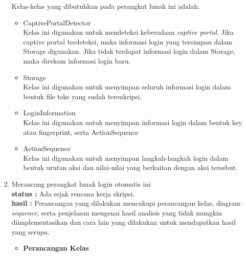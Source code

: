 \documentclass[a4paper,twoside]{article}
\begin{document}
\begin{enumerate}
        Kelas-kelas yang dibutuhkan pada perangkat lunak ini adalah:
        
        \begin{itemize}
            \item{CaptivePortalDetector\\Kelas ini digunakan untuk mendeteksi keberadaan \textit{captive portal}. Jika captive portal terdeteksi, maka informasi login yang tersimpan dalam Storage digunakan. Jika tidak terdapat informasi login dalam Storage, maka direkam informasi login baru.}
            \item{Storage\\Kelas ini digunakan untuk menyimpan seluruh informasi login dalam bentuk file teks yang sudah terenkripsi.}
            \item{LoginInformation\\Kelas ini digunakan untuk menyimpan informasi login dalam bentuk key atau fingerprint, serta ActionSequence}
            \item{ActionSequence\\Kelas ini digunakan untuk menyimpan langkah-langkah login dalam bentuk urutan aksi dan nilai-nilai yang berkaitan dengan aksi tersebut.}
        \end{itemize}

		\item Merancang perangkat lunak login otomatis ini\\
		{\bf status :} Ada sejak rencana kerja skripsi.\\
		{\bf hasil :} Perancangan yang dilakukan mencakupi perancangan kelas, diagram \textit{sequence}, serta penjelasan mengenai hasil analisis yang tidak mungkin diimplementasikan dan cara lain yang dilakukan untuk mendapatkan hasil yang serupa.
        \begin{itemize}
            \item{
                {\bf Perancangan Kelas}
                
}
\end{itemize}
\end{enumerate}
\end{document}
